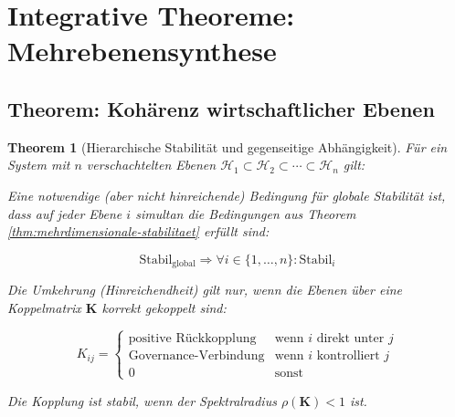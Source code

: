 \documentclass[a4paper, 12pt, twoside, openright]{report}
\newtheorem{theorem}{Theorem}[section]
\theoremstyle{definition}
\theoremstyle{definition}
\begin{document}
\section{Integrative Theoreme: Mehrebenensynthese}

\subsection{Theorem: Kohärenz wirtschaftlicher Ebenen}

\begin{theorem}[Hierarchische Stabilität und gegenseitige Abhängigkeit]
\label{thm:hierarchische-stabilitaet}
Für ein System mit $n$ verschachtelten Ebenen $\mathcal{H}_1 \subset \mathcal{H}_2 \subset \cdots \subset \mathcal{H}_n$ gilt:

Eine notwendige (aber nicht hinreichende) Bedingung für globale Stabilität ist, dass auf \emph{jeder} Ebene $i$ simultan die Bedingungen aus Theorem \ref{thm:mehrdimensionale-stabilitaet} erfüllt sind:

\begin{equation}
\text{Stabil}_{\text{global}} \Rightarrow \forall i \in \{1,\ldots,n\}: \text{Stabil}_i
\end{equation}

Die Umkehrung (Hinreichendheit) gilt nur, wenn die Ebenen über eine Koppelmatrix $\mathbf{K}$ korrekt gekoppelt sind:

\begin{equation}
K_{ij} = \begin{cases}
\text{positive Rückkopplung} & \text{wenn } i \text{ direkt unter } j \\
\text{Governance-Verbindung} & \text{wenn } i \text{ kontrolliert } j \\
0 & \text{sonst}
\end{cases}
\end{equation}

Die Kopplung ist stabil, wenn der Spektralradius $\rho(\mathbf{K}) < 1$ ist.
\end{theorem}
\end{document}
